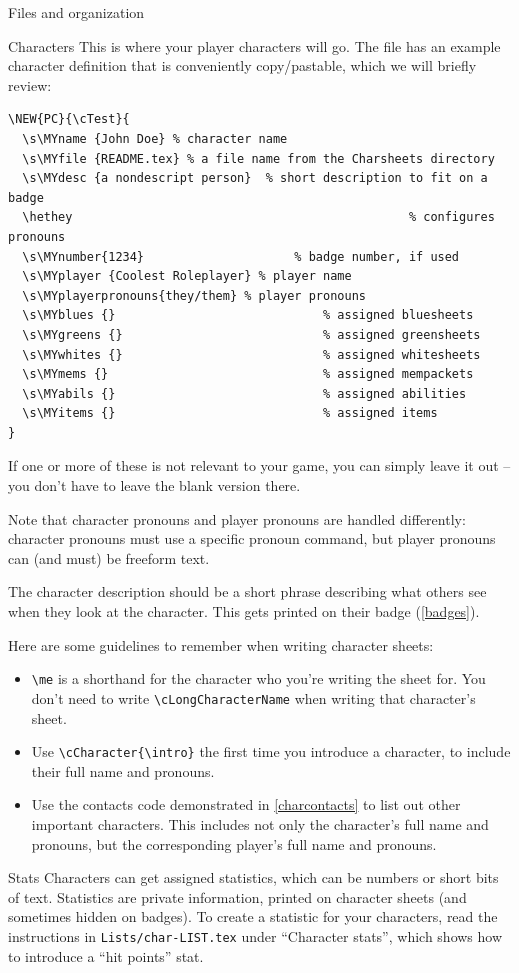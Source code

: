 \documentclass[sheet]{GameTexBase}
\begin{document}
\begin{section}{Files and organization}
\begin{subsection}{Characters}
This is where your player characters will go.  The file has an example character definition that is conveniently copy/pastable, which we will briefly review:
\begin{verbatim}
\NEW{PC}{\cTest}{
  \s\MYname	{John Doe} % character name
  \s\MYfile {README.tex} % a file name from the Charsheets directory
  \s\MYdesc	{a nondescript person}  % short description to fit on a badge
  \hethey												% configures pronouns
  \s\MYnumber{1234}						% badge number, if used
  \s\MYplayer {Coolest Roleplayer} % player name
  \s\MYplayerpronouns{they/them} % player pronouns
  \s\MYblues {}								% assigned bluesheets
  \s\MYgreens {}							% assigned greensheets
  \s\MYwhites {}							% assigned whitesheets
  \s\MYmems {}								% assigned mempackets
  \s\MYabils {}								% assigned abilities
  \s\MYitems {}								% assigned items
}
\end{verbatim}
If one or more of these is not relevant to your game, you can simply leave it out -- you don't have to leave the blank version there.

Note that character pronouns and player pronouns are handled differently: character pronouns must use a specific pronoun command, but player pronouns can (and must) be freeform text.

The character description should be a short phrase describing what others see when they look at the character.  This gets printed on their badge (\ref{badges}).

Here are some guidelines to remember when writing character sheets:
\begin{itemize}
\item \lstinline|\me| is a shorthand for the character who you're writing the sheet for.  You don't need to write \lstinline|\cLongCharacterName| when writing that character's sheet.
\item Use \lstinline|\cCharacter{\intro}| the first time you introduce a character, to include their full name and pronouns.
\item Use the contacts code demonstrated in \ref{charcontacts} to list out other important characters.  This includes not only the character's full name and pronouns, but the corresponding player's full name and pronouns.
\end{itemize}
\begin{subsubsection}{Stats}
\label{charstats}
Characters can get assigned statistics, which can be numbers or short bits of text.  Statistics are private information, printed on character sheets (and sometimes hidden on badges).  To create a statistic for your characters, read the instructions in \lstinline|Lists/char-LIST.tex| under ``Character stats'', which shows how to introduce a ``hit points'' stat.


\end{subsubsection}
\end{subsection}
\end{section}
\end{document}

